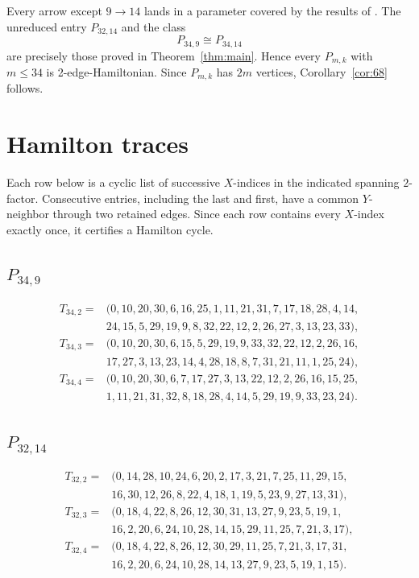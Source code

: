 \documentclass[11pt]{amsart}
\begin{document}
Every arrow except $9\to14$ lands in a parameter covered by the results of
\cite{Simmons2020}. The unreduced entry $P_{32,14}$ and the class
\[
 P_{34,9}\cong P_{34,14}
\]
are precisely those proved in Theorem~\ref{thm:main}. Hence every
$P_{m,k}$ with $m\le34$ is 2-edge-Hamiltonian. Since $P_{m,k}$ has $2m$
vertices, Corollary~\ref{cor:68} follows.

\appendix

\section{Hamilton traces}\label{app:traces}

Each row below is a cyclic list of successive $X$-indices in the indicated
spanning $2$-factor. Consecutive entries, including the last and first,
have a common $Y$-neighbor through two retained edges. Since each row
contains every $X$-index exactly once, it certifies a Hamilton cycle.

\subsection*{\texorpdfstring{$P_{34,9}$}{P34,9}}

{\scriptsize
\begin{align*}
T_{34,2}={}&
(0,10,20,30,6,16,25,1,11,21,31,7,17,18,28,4,14,\\
&24,15,5,29,19,9,8,32,22,12,2,26,27,3,13,23,33),
\\[2pt]
T_{34,3}={}&
(0,10,20,30,6,15,5,29,19,9,33,32,22,12,2,26,16,\\
&17,27,3,13,23,14,4,28,18,8,7,31,21,11,1,25,24),
\\[2pt]
T_{34,4}={}&
(0,10,20,30,6,7,17,27,3,13,22,12,2,26,16,15,25,\\
&1,11,21,31,32,8,18,28,4,14,5,29,19,9,33,23,24).
\end{align*}
}

\subsection*{\texorpdfstring{$P_{32,14}$}{P32,14}}

{\scriptsize
\begin{align*}
T_{32,2}={}&
(0,14,28,10,24,6,20,2,17,3,21,7,25,11,29,15,\\
&16,30,12,26,8,22,4,18,1,19,5,23,9,27,13,31),
\\[2pt]
T_{32,3}={}&
(0,18,4,22,8,26,12,30,31,13,27,9,23,5,19,1,\\
&16,2,20,6,24,10,28,14,15,29,11,25,7,21,3,17),
\\[2pt]
T_{32,4}={}&
(0,18,4,22,8,26,12,30,29,11,25,7,21,3,17,31,\\
&16,2,20,6,24,10,28,14,13,27,9,23,5,19,1,15).
\end{align*}
}
\end{document}
